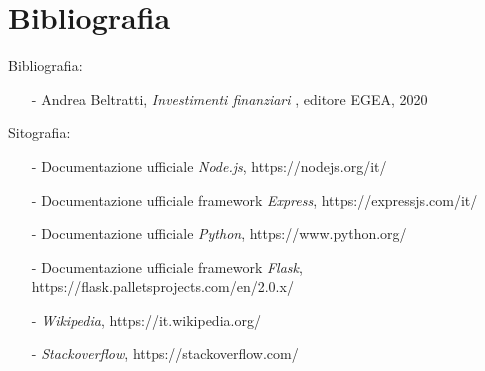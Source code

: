 \chapter*{Bibliografia}

Bibliografia:
\begin{enumerate}
    \item [-] Andrea Beltratti, \textit{Investimenti finanziari} , editore EGEA, 2020
\end{enumerate}

\noindent
\newline
Sitografia:
\begin{enumerate}
    \item [-] Documentazione ufficiale \textit{Node.js}, https://nodejs.org/it/
    \item [-] Documentazione ufficiale framework \textit{Express}, https://expressjs.com/it/
    \item [-] Documentazione ufficiale \textit{Python}, https://www.python.org/
    \item [-] Documentazione ufficiale framework \textit{Flask}, https://flask.palletsprojects.com/en/2.0.x/
    \item [-] \textit{Wikipedia}, https://it.wikipedia.org/
    \item [-] \textit{Stackoverflow}, https://stackoverflow.com/
\end{enumerate}